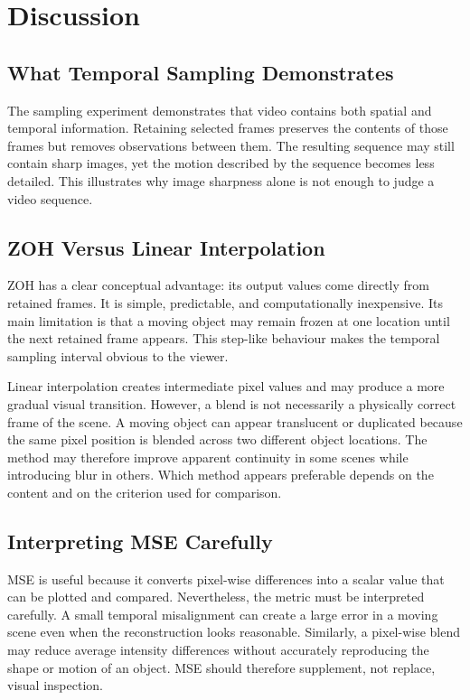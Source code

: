 \documentclass[12pt,a4paper,oneside]{report}
\begin{document}
\chapter{Discussion}
\section{What Temporal Sampling Demonstrates}
The sampling experiment demonstrates that video contains both spatial and temporal information. Retaining selected frames preserves the contents of those frames but removes observations between them. The resulting sequence may still contain sharp images, yet the motion described by the sequence becomes less detailed. This illustrates why image sharpness alone is not enough to judge a video sequence.

\section{ZOH Versus Linear Interpolation}
ZOH has a clear conceptual advantage: its output values come directly from retained frames. It is simple, predictable, and computationally inexpensive. Its main limitation is that a moving object may remain frozen at one location until the next retained frame appears. This step-like behaviour makes the temporal sampling interval obvious to the viewer.

Linear interpolation creates intermediate pixel values and may produce a more gradual visual transition. However, a blend is not necessarily a physically correct frame of the scene. A moving object can appear translucent or duplicated because the same pixel position is blended across two different object locations. The method may therefore improve apparent continuity in some scenes while introducing blur in others. Which method appears preferable depends on the content and on the criterion used for comparison.

\section{Interpreting MSE Carefully}
MSE is useful because it converts pixel-wise differences into a scalar value that can be plotted and compared. Nevertheless, the metric must be interpreted carefully. A small temporal misalignment can create a large error in a moving scene even when the reconstruction looks reasonable. Similarly, a pixel-wise blend may reduce average intensity differences without accurately reproducing the shape or motion of an object. MSE should therefore supplement, not replace, visual inspection.
\end{document}
